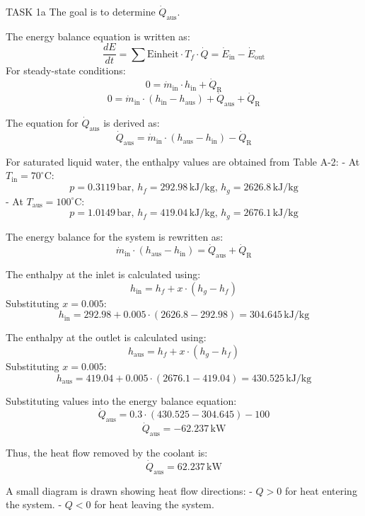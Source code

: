 TASK 1a  
The goal is to determine \( \dot{Q}_{\text{aus}} \).  

The energy balance equation is written as:  
\[
\frac{dE}{dt} = \sum \text{Einheit} \cdot T_f \cdot \dot{Q} = \dot{E}_{\text{in}} - \dot{E}_{\text{out}}
\]  
For steady-state conditions:  
\[
0 = \dot{m}_{\text{in}} \cdot h_{\text{in}} + \dot{Q}_{\text{R}}
\]  
\[
0 = \dot{m}_{\text{in}} \cdot (h_{\text{in}} - h_{\text{aus}}) + \dot{Q}_{\text{aus}} + \dot{Q}_{\text{R}}
\]  

The equation for \( \dot{Q}_{\text{aus}} \) is derived as:  
\[
\dot{Q}_{\text{aus}} = \dot{m}_{\text{in}} \cdot (h_{\text{aus}} - h_{\text{in}}) - \dot{Q}_{\text{R}}
\]  

For saturated liquid water, the enthalpy values are obtained from Table A-2:  
- At \( T_{\text{in}} = 70^\circ\text{C} \):  
  \[
  p = 0.3119 \, \text{bar}, \, h_f = 292.98 \, \text{kJ/kg}, \, h_g = 2626.8 \, \text{kJ/kg}
  \]  
- At \( T_{\text{aus}} = 100^\circ\text{C} \):  
  \[
  p = 1.0149 \, \text{bar}, \, h_f = 419.04 \, \text{kJ/kg}, \, h_g = 2676.1 \, \text{kJ/kg}
  \]  

The energy balance for the system is rewritten as:  
\[
\dot{m}_{\text{in}} \cdot (h_{\text{aus}} - h_{\text{in}}) = \dot{Q}_{\text{aus}} + \dot{Q}_{\text{R}}
\]  

The enthalpy at the inlet is calculated using:  
\[
h_{\text{in}} = h_f + x \cdot (h_g - h_f)
\]  
Substituting \( x = 0.005 \):  
\[
h_{\text{in}} = 292.98 + 0.005 \cdot (2626.8 - 292.98) = 304.645 \, \text{kJ/kg}
\]  

The enthalpy at the outlet is calculated using:  
\[
h_{\text{aus}} = h_f + x \cdot (h_g - h_f)
\]  
Substituting \( x = 0.005 \):  
\[
h_{\text{aus}} = 419.04 + 0.005 \cdot (2676.1 - 419.04) = 430.525 \, \text{kJ/kg}
\]  

Substituting values into the energy balance equation:  
\[
\dot{Q}_{\text{aus}} = 0.3 \cdot (430.525 - 304.645) - 100
\]  
\[
\dot{Q}_{\text{aus}} = -62.237 \, \text{kW}
\]  

Thus, the heat flow removed by the coolant is:  
\[
\dot{Q}_{\text{aus}} = 62.237 \, \text{kW}
\]  

A small diagram is drawn showing heat flow directions:  
- \( Q > 0 \) for heat entering the system.  
- \( Q < 0 \) for heat leaving the system.  

